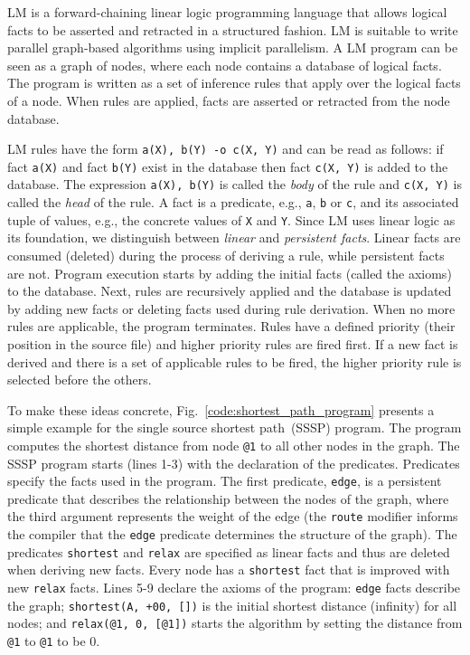 \newcommand{\mytt}[1]{\texttt{#1}}
\newcommand{\comprehension}[3]{\{ \; #1; \; #2; \; #3 \; \}}
\newcommand{\aggregate}[6]{[\; #1 \Rightarrow #2; \; #3; \; #4; \; #5; \; #6 \;]}

LM is a forward-chaining linear logic programming language that allows logical
facts to be asserted and retracted in a structured fashion. LM is suitable to
write parallel graph-based algorithms using implicit parallelism.
A LM program can be seen as a graph of nodes, where each node contains a
database of logical facts. The program is written as a set of inference rules
that apply over the logical facts of a node. When rules are applied, facts are
asserted or retracted from the node database.

LM rules have the form \mytt{a(X), b(Y) -o c(X, Y)} and can be read as follows:
if fact \mytt{a(X)} and fact \mytt{b(Y)} exist in the database then fact \mytt{c(X,
      Y)} is added to the database. The expression \mytt{a(X), b(Y)} is called
the \emph{body} of the rule and \mytt{c(X, Y)} is called the \emph{head} of the rule.
A fact is a predicate, e.g., \mytt{a}, \mytt{b} or \mytt{c}, and its associated
tuple of values, e.g., the concrete values of \mytt{X} and \mytt{Y}. Since LM
uses linear logic as its foundation, we distinguish between \emph{linear} and
\emph{persistent facts}. Linear facts are consumed (deleted) during the process of deriving
a rule, while persistent facts are not.  Program execution starts by adding the
initial facts (called the axioms) to the database. Next, rules are recursively
applied and the database is updated by adding new facts or deleting facts used
during rule derivation.  When no more rules are applicable, the program
terminates. Rules have a defined priority (their position in the source file)
and higher priority rules are fired first. If a new fact is derived and there is
a set of applicable rules to be fired, the higher priority rule is 
selected before the others.

To make these ideas concrete, Fig.~\ref{code:shortest_path_program} presents
a simple example for the single source shortest path~(SSSP) program.
The program computes
the shortest distance from node \mytt{@1} to all other nodes in the
graph.
The SSSP program starts (lines 1-3) with the declaration of the predicates.
Predicates specify the facts used in the program. The first predicate,
\mytt{edge}, is a persistent predicate that describes the
relationship between the nodes of the graph, where the third argument
represents the weight of the edge (the \mytt{route} modifier
informs the compiler that the \mytt{edge} predicate
determines the structure of the graph).  The predicates
\mytt{shortest} and \mytt{relax} are specified as linear facts
and thus are deleted when deriving new facts.
Every node has a \mytt{shortest} fact that is improved with
new \mytt{relax} facts.  Lines 5-9 declare the axioms of the
program: \mytt{edge} facts describe the graph; \mytt{shortest(A,
+00, [])} is the initial shortest distance (infinity) for all
nodes; and \mytt{relax(@1, 0, [@1])} starts the algorithm by
setting the distance from \mytt{@1} to \mytt{@1} to be 0.

